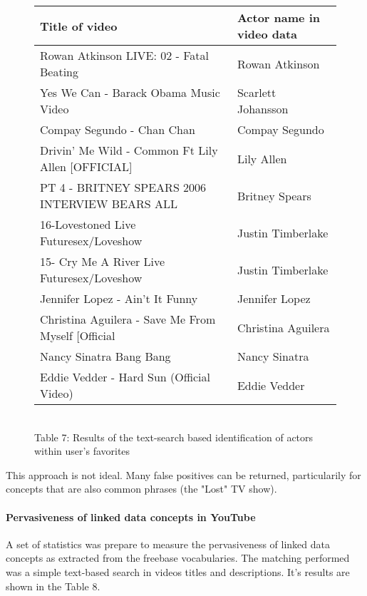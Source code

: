 \begin{figure}[h!]
  \begin{center}
    \begin{tabular}{ | p{7cm} | p{4cm} | } \hline
      Title of video & Actor name in video data \\ \hline
      Rowan Atkinson LIVE: 02 - Fatal Beating & Rowan Atkinson \\ \hline
      Yes We Can - Barack Obama Music Video & Scarlett Johansson \\ \hline
      Compay Segundo - Chan Chan & Compay Segundo \\ \hline
      Drivin' Me Wild - Common Ft Lily Allen [OFFICIAL] & Lily Allen \\ \hline
      PT 4 - BRITNEY SPEARS 2006 INTERVIEW BEARS ALL & Britney Spears \\ \hline
      16-Lovestoned Live Futuresex/Loveshow & Justin Timberlake \\ \hline
      15- Cry Me A River Live Futuresex/Loveshow & Justin Timberlake \\ \hline
      Jennifer Lopez - Ain't It Funny & Jennifer Lopez \\ \hline
      Christina Aguilera - Save Me From Myself [Official & Christina Aguilera \\ \hline
      Nancy Sinatra Bang Bang & Nancy Sinatra \\ \hline
      Eddie Vedder - Hard Sun (Official Video) & Eddie Vedder \\ \hline
    \end{tabular} \\
    Table 7: Results of the text-search based identification of actors within user's favorites \\
  \end{center}
\end{figure}

This approach is not ideal. Many false positives can be returned, particularily
for concepts that are also common phrases (\eg the "Lost" TV show).

\paragraph{Pervasiveness of linked data concepts in YouTube}
A set of statistics was prepare to measure the pervasiveness of linked data
concepts as extracted from the freebase vocabularies. The matching performed
was a simple text-based search in videos titles and descriptions. It's results
are shown in the Table 8.

